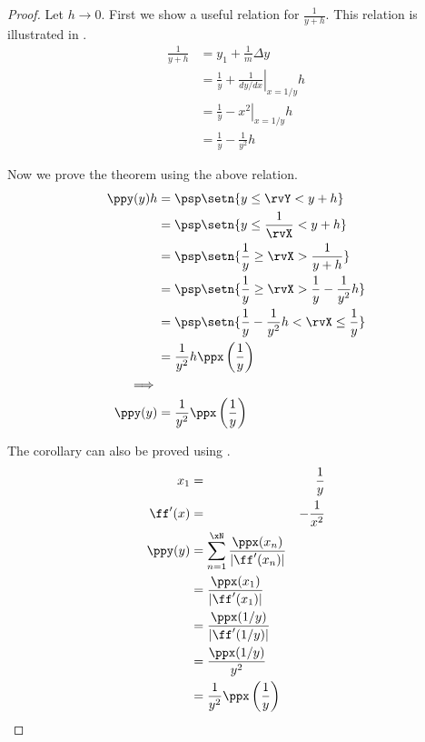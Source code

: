 \begin{proof}
Let $h\to0$.
First we show a useful relation for $\frac{1}{y+h}$.
This relation is illustrated in .
\begin{align*}
  \frac{1}{y+h}
    &=    y_1 + \frac{1}{m} \Delta y
  \\&=    \frac{1}{y} + \left.\frac{1}{dy/dx}\right|_{x=1/y} h
  \\&=    \frac{1}{y} - \left.x^2\right|_{x=1/y} h
  \\&=    \frac{1}{y} - \frac{1}{y^2} h
\end{align*}

Now we prove the theorem using the above relation.
\begin{align*}
  \ppy(y)h
    &=    \psp\setn{y\le\rvY < y+h}
  \\&=    \psp\setn{y\le \frac{1}{\rvX} < y+h}
  \\&=    \psp\setn{\frac{1}{y}\ge\rvX > \frac{1}{y+h}}
  \\&=    \psp\setn{\frac{1}{y}\ge\rvX > \frac{1}{y}-\frac{1}{y^2}h}
  \\&=    \psp\setn{\frac{1}{y}-\frac{1}{y^2}h < \rvX \le \frac{1}{y} }
  \\&=    \frac{1}{y^2}h \ppx\left( \frac{1}{y} \right)
\\\implies
\\
  \ppy(y)
    &=    \frac{1}{y^2} \ppx\left( \frac{1}{y} \right)
\end{align*}

The corollary can also be proved using .
\begin{align*}
  x_1 &=& \frac{1}{y} \\
  \ff'(x) &=& -\frac{1}{x^2}    \\
  \ppy(y)
    &= \sum_{n=1}^{\xN} \frac{\ppx(x_n)}{|\ff'(x_n)|}
  \\&= \frac{\ppx(x_1)}{|\ff'(x_1)|}
  \\&= \frac{\ppx(1/y)}{|\ff'(1/y)|}
  \\&= \frac{\ppx(1/y)}{y^2}
  \\&= \frac{1}{y^2} \ppx\left( \frac{1}{y} \right)
\end{align*}
\end{proof}

